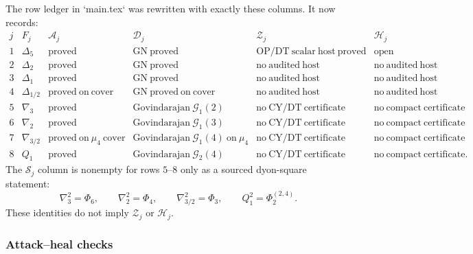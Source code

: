 The row ledger in `main.tex` was rewritten with exactly these columns.
It now records:
\[
\begin{array}{c|c|c|c|c|c}
j&F_j&\mathscr A_j&\mathscr D_j&\mathscr Z_j&\mathscr H_j\\ \hline
1&\Delta_5&\mathrm{proved}&\mathrm{GN\ proved}&
\mathrm{OP/DT\ scalar\ host\ proved}&\mathrm{open}\\
2&\Delta_2&\mathrm{proved}&\mathrm{GN\ proved}&
\mathrm{no\ audited\ host}&\mathrm{no\ audited\ host}\\
3&\Delta_1&\mathrm{proved}&\mathrm{GN\ proved}&
\mathrm{no\ audited\ host}&\mathrm{no\ audited\ host}\\
4&\Delta_{1/2}&\mathrm{proved\ on\ cover}&
\mathrm{GN\ proved\ on\ cover}&
\mathrm{no\ audited\ host}&\mathrm{no\ audited\ host}\\
5&\nabla_3&\mathrm{proved}&
\mathrm{Govindarajan\ }\mathcal G_1(2)&
\mathrm{no\ CY/DT\ certificate}&\mathrm{no\ compact\ certificate}\\
6&\nabla_2&\mathrm{proved}&
\mathrm{Govindarajan\ }\mathcal G_1(3)&
\mathrm{no\ CY/DT\ certificate}&\mathrm{no\ compact\ certificate}\\
7&\nabla_{3/2}&\mathrm{proved\ on\ }\mu_4\mathrm{\ cover}&
\mathrm{Govindarajan\ }\mathcal G_1(4)\ \mathrm{on\ }\mu_4&
\mathrm{no\ CY/DT\ certificate}&\mathrm{no\ compact\ certificate}\\
8&Q_1&\mathrm{proved}&
\mathrm{Govindarajan\ }\mathcal G_2(4)&
\mathrm{no\ CY/DT\ certificate}&\mathrm{no\ compact\ certificate}.
\end{array}
\]
The \(\mathscr S_j\) column is nonempty for rows \(5\)--\(8\) only as a
sourced dyon-square statement:
\[
\nabla_3^2=\Phi_6,\qquad
\nabla_2^2=\Phi_4,\qquad
\nabla_{3/2}^2=\Phi_3,\qquad
Q_1^2=\Phi_2^{(2,4)}.
\]
These identities do not imply \(\mathscr Z_j\) or \(\mathscr H_j\).

\subsubsection*{Attack--heal checks}

